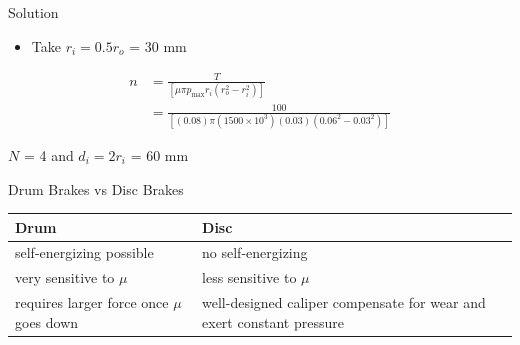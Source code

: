 \documentclass[10pt, svgnames]{beamer}
\begin{document}
\begin{frame}[label={sec:org6322ad8}]{Solution}
\begin{itemize}
\item Take \(r_{i} = 0.5r_{o}\) = 30 mm
\end{itemize}

\begin{align*}
    n &= \frac{T}{\left[ \mu \pi p_{\max} r_i \left( r_o^2 - r_i^2 \right) \right]} \\
        &= \frac{100}{\left[ (0.08)\pi(1500 \times 10^3)(0.03) \left( 0.06^2 - 0.03^2 \right) \right]}
\end{align*}

\(N\) = 4 and \(d_i = 2r_i\) = 60 mm
\end{frame}

\begin{frame}[label={sec:orga247d04}]{Drum Brakes vs Disc Brakes}
\begin{center}
\begin{tabular}{p{5cm}p{5cm}}
\toprule
Drum & Disc\\
\midrule
self-energizing possible & no self-energizing\\
\midrule
very sensitive to \(\mu\) & less sensitive to \(\mu\)\\
\midrule
requires larger force once \(\mu\) goes down & well-designed caliper compensate for wear and exert constant pressure\\
\bottomrule
\end{tabular}
\end{center}
\end{frame}
\end{document}
